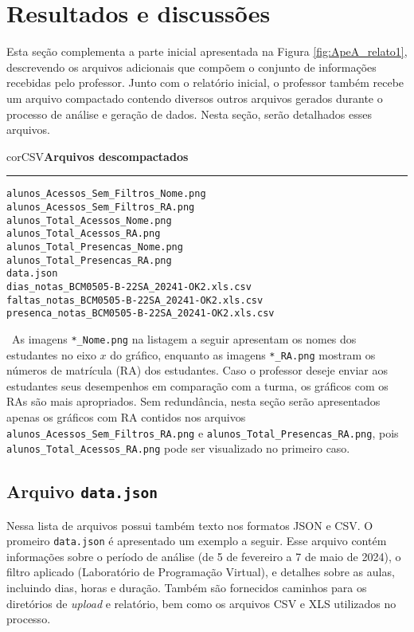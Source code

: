 \section{Resultados e discussões}\label{sec:apendice_resultados}

Esta seção complementa a parte inicial apresentada na Figura \ref{fig:ApeA_relato1}, descrevendo os arquivos adicionais que compõem o conjunto de informações recebidas pelo professor. Junto com o relatório inicial, o professor também recebe um arquivo compactado contendo diversos outros arquivos gerados durante o processo de análise e geração de dados. Nesta seção, serão detalhados esses arquivos.
\
\begin{myboxCode}{corCSV}{\textbf{Arquivos descompactados}}\vspace{3mm}
\hrule
\begin{verbatim}
alunos_Acessos_Sem_Filtros_Nome.png
alunos_Acessos_Sem_Filtros_RA.png
alunos_Total_Acessos_Nome.png
alunos_Total_Acessos_RA.png
alunos_Total_Presencas_Nome.png
alunos_Total_Presencas_RA.png
data.json
dias_notas_BCM0505-B-22SA_20241-OK2.xls.csv
faltas_notas_BCM0505-B-22SA_20241-OK2.xls.csv
presenca_notas_BCM0505-B-22SA_20241-OK2.xls.csv
\end{verbatim}
\end{myboxCode}
\
As imagens \verb|*_Nome.png| na listagem a seguir apresentam os nomes dos estudantes no eixo $x$ do gráfico, enquanto as imagens \verb|*_RA.png| mostram os números de matrícula (RA) dos estudantes. Caso o professor deseje enviar aos estudantes seus desempenhos em comparação com a turma, os gráficos com os RAs são mais apropriados. Sem redundância, nesta seção serão apresentados apenas os gráficos com RA contidos nos arquivos \verb|alunos_Acessos_Sem_Filtros_RA.png| e \verb|alunos_Total_Presencas_RA.png|, pois \verb|alunos_Total_Acessos_RA.png| pode ser visualizado no primeiro caso.

\subsection{Arquivo \texttt{data.json}}

Nessa lista de arquivos possui também texto nos formatos JSON e CSV. O promeiro \verb|data.json| é apresentado um exemplo a seguir. Esse arquivo contém informações sobre o período de análise (de 5 de fevereiro a 7 de maio de 2024), o filtro aplicado (Laboratório de Programação Virtual), e detalhes sobre as aulas, incluindo dias, horas e duração. Também são fornecidos caminhos para os diretórios de \textit{upload} e relatório, bem como os arquivos CSV e XLS utilizados no processo.


